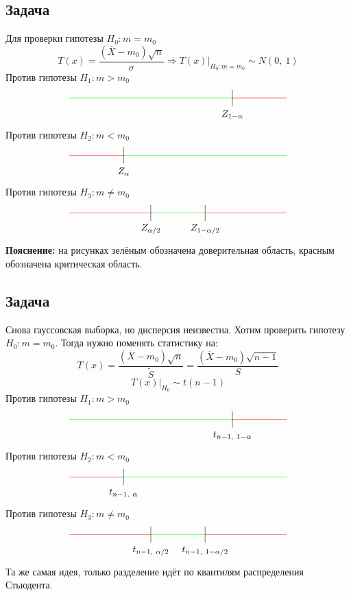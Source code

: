 \documentclass[12pt, a4paper]{article}
\begin{document}
\subsection*{Задача}
Для проверки гипотезы $H_0: m = m_0$
\[T(x) = \frac{(\overline{X} - m_0)\sqrt{n}}{\sigma}\Rightarrow T(x)\big|_{H_0: m = m_0} \sim N(0,\ 1)\]
Против гипотезы $H_1: m > m_0$
\[\begin{tikzpicture}[scale = 2]
    \draw[color=green] (-2, 0) -- (1, 0);
    \draw[color=red] (1, 0) -- (2, 0);
    \draw (1, 0.15) -- (1, -0.15);
    \node at (1, -0.3) (a) {$Z_{1 - \alpha}$};
\end{tikzpicture}\]
Против гипотезы $H_2: m < m_0$
\[\begin{tikzpicture}[scale = 2]
    \draw[color=green] (-1, 0) -- (2, 0);
    \draw[color=red] (-2, 0) -- (-1, 0);
    \draw (-1, -0.15) -- (-1, 0.15);
    \node at (-1, -0.3) (a) {$Z_{\alpha}$};
\end{tikzpicture}\]
Против гипотезы $H_3: m \neq m_0$
\[\begin{tikzpicture}[scale = 2]
    \draw[color=red] (-2, 0) -- (-0.5, 0);
    \draw[color=red] (0.5, 0) -- (2, 0);
    \draw[color=green] (-0.5, 0) -- (0.5, 0);
    \draw (0.5, -0.15) -- (0.5, 0.15);
    \draw (-0.5, -0.15) -- (-0.5, 0.15);
    \node at(-0.5, -0.3) (a) {$Z_{\alpha/2}$};
    \node at(0.5, -0.3) (a) {$Z_{1 - \alpha/2}$};
\end{tikzpicture}\]
\textbf{Пояснение:} на рисунках зелёным обозначена доверительная область, красным обозначена критическая область.
\subsection*{Задача}
Снова гауссовская выборка, но дисперсия неизвестна. Хотим проверить гипотезу $H_0: m = m_0$. Тогда нужно поменять статистику на:
\[T(x) = \frac{(\overline{X} - m_0) \sqrt{n}}{\tilde{S}} = \frac{(\overline{X} - m_0)\sqrt{n - 1}}{S}\]
\[T(x) \big|_{H_0} \sim t(n - 1)\]
Против гипотезы $H_1: m > m_0$
\[\begin{tikzpicture}[scale = 2]
    \draw[color=green] (-2, 0) -- (1, 0);
    \draw[color=red] (1, 0) -- (2, 0);
    \draw (1, 0.15) -- (1, -0.15);
    \node at (1, -0.3) (a) {$t_{n - 1,\ 1 - \alpha}$};
\end{tikzpicture}\]
Против гипотезы $H_2: m < m_0$
\[\begin{tikzpicture}[scale = 2]
    \draw[color=green] (-1, 0) -- (2, 0);
    \draw[color=red] (-2, 0) -- (-1, 0);
    \draw (-1, -0.15) -- (-1, 0.15);
    \node at (-1, -0.3) (a) {$t_{n - 1,\ \alpha}$};
\end{tikzpicture}\]
Против гипотезы $H_3: m \neq m_0$
\[\begin{tikzpicture}[scale = 2]
    \draw[color=red] (-2, 0) -- (-0.5, 0);
    \draw[color=red] (0.5, 0) -- (2, 0);
    \draw[color=green] (-0.5, 0) -- (0.5, 0);
    \draw (0.5, -0.15) -- (0.5, 0.15);
    \draw (-0.5, -0.15) -- (-0.5, 0.15);
    \node at(-0.5, -0.3) (a) {$t_{n - 1,\ \alpha/2}$};
    \node at(0.5, -0.3) (a) {$t_{n - 1,\ 1 - \alpha/2}$};
\end{tikzpicture}\]
Та же самая идея, только разделение идёт по квантилям распределения Стьюдента.
\end{document}
